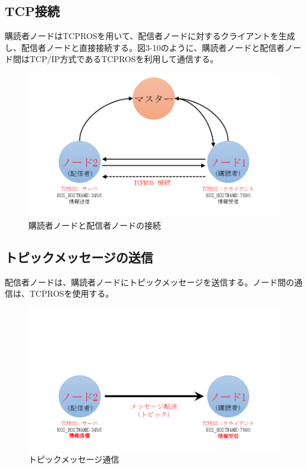 \subsection{TCP接続}
購読者ノードはTCPROSを用いて、配信者ノードに対するクライアントを生成し、配信者ノードと直接接続する。図3-10のように、購読者ノードと配信者ノード間はTCP/IP方式であるTCPROSを利用して通信する。

\begin{figure}[h]
  \centering
  \includegraphics[width=\columnwidth]{pictures/chapter3/pic_03_10.png}
  \caption{購読者ノードと配信者ノードの接続}
\end{figure}

\subsection{トピックメッセージの送信}
配信者ノードは、購読者ノードにトピックメッセージを送信する。ノード間の通信は、TCPROSを使用する。

\begin{figure}[h]
  \centering
  \includegraphics[width=\columnwidth]{pictures/chapter3/pic_03_11.png}
  \caption{トピックメッセージ通信}
\end{figure}

